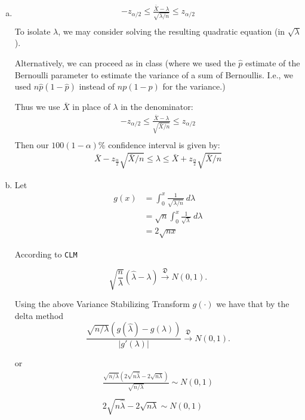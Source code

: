 \documentclass[12pt]{article}
\begin{document}
\begin{enumerate}[(a)]
\item 
\begin{align*}
-z_{\alpha/2} \leq  \frac{\bar X - \lambda}{\sqrt{\lambda /  n}}   \leq z_{\alpha/2} \\
\end{align*}
To isolate $\lambda$, we may consider solving the resulting quadratic equation (in $\sqrt{\lambda}$). 

Alternatively, we can proceed as in class (where we used the $\hat p$ estimate of the Bernoulli parameter to estimate the variance of a sum of  Bernoullis. I.e., we used $n \hat p (1 - \hat p)$ instead of $ n p (1 -  p)$ for the variance.)

Thus we use  $\bar X$ in place of $\lambda$ in the denominator:
\begin{align*}
-z_{\alpha/2} \leq  \frac{\bar X - \lambda}{\sqrt{\bar X /  n}}   \leq z_{\alpha/2} \\
\end{align*}
Then our   $100(1 - \alpha)\%$ confidence interval is given by:
\begin{align*}
\bar X - z_{\frac{\alpha}{2}} \sqrt{\bar X /  n}  \leq \lambda \leq \bar X + z_{\frac{\alpha}{2}}\sqrt{\bar X /  n}
\end{align*}


\item Let 
\begin{align*}
g(x)& = \int_0^x \frac{1} {\sqrt{\lambda / n} }\  d\lambda \\
&=\sqrt n \int_0^x \frac{1} {\sqrt{\lambda} }\  d\lambda \\
&=2\sqrt {n x}
\end{align*}

According to \texttt{CLM}

$$\sqrt{\frac{n}{\lambda}} (\hat \lambda - \lambda) \xrightarrow{\mathfrak{D}} N(0,1).$$

Using the above Variance Stabilizing Transform $g(\cdot)$ we have that by the delta method
$$\frac{\sqrt{n/\lambda} (g(\hat \lambda)  - g(\lambda))}{|g'(\lambda)|} \xrightarrow{\mathfrak{D}}  N(0,1).$$

or
\begin{align*}
\frac{\sqrt{n/\lambda} (2\sqrt{n \hat \lambda } - 2\sqrt{n \lambda})}{\sqrt{n/\lambda}} \sim N(0,1) \\
\\
2\sqrt{n \hat \lambda} - 2\sqrt{n \lambda} \sim N(0,1)
\end{align*}


\end{enumerate}
\end{document}
